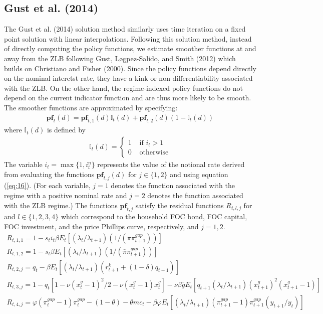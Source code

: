 \documentclass[12pt, final]{article}
\begin{document}
\subsection{Gust et al. (2014)}
The Gust et al. (2014) solution method similarly uses time iteration on a fixed point solution with linear interpolations. Following this solution method, instead of directly computing the policy functions, we estimate smoother functions at and away from the ZLB following Gust, L{\o g}pez-Salido, and Smith (2012) which builds on Christiano and Fisher (2000). Since the policy functions depend directly on the nominal interetst rate, they have a kink or non-differentiability associated with the ZLB.  On the other hand, the regime-indexed policy functions do not depend on the current indicator function and are thus more likely to be smooth. The smoother functions are approximated by specifying:
\begin{gather}
  \textbf{pf}_t(d) = \textbf{pf}_{t,1}(d)\mathds{I}_t(d) + \textbf{pf}_{t,2}(d)(1-\mathds{I}_t(d))
\end{gather}
where $\mathds{I}_t(d)$ is defined by
\begin{gather}
  \mathds{I}_t(d) = 
\begin{cases}
     1 &\text{ if } i_t > 1\\
     0 &\text{ otherwise}
\end{cases}
\end{gather}
The variable $i_t=\max\{1,i_t^n\}$ represents the value of the notional rate derived from evaluating the functions $\textbf{pf}_{t,j}(d)$ for $j \in \{1,2\}$ and using equation (\ref{eq:16}). (For each variable, $j=1$ denotes the function associated with the regime with a positive nominal rate and $j=2$ denotes the function associated with the ZLB regime.) %
The functions $\textbf{pf}_{t,j}$ satisfy the residual functions $R_{t,l,j}$ for and $l \in \{1,2,3,4\}$ which correspond to the household FOC bond, FOC capital, FOC investment, and the price Phillips curve, respectively, and $j = 1,2$.
\begin{gather}
  R_{t,1,1} = 1 - s_ti_t\beta E_t[(\lambda_t/\lambda_{t+1})(1/(\bar{\pi}\pi_{t+1}^{gap}))]\\
  R_{t,1,2} = 1 - s_t\beta E_t[(\lambda_t/\lambda_{t+1})(1/(\bar{\pi}\pi_{t+1}^{gap}))]\\
  R_{t,2,j} = q_t - \beta E_t[(\lambda_t/\lambda_{t+1})(r^k_{t+1}+(1-\delta)q_{t+1})]\\
  R_{t,3,j} = 1 - q_t[1-\nu(x^g_t-1)^2/2 - \nu(x_t^g-1)x_t^g] - \nu\beta\bar{g}E_t[q_{t+1}(\lambda_t/\lambda_{t+1})(x^g_{t+1})^2(x^g_{t+1}-1)]\\
  R_{t,4,j} = \varphi(\pi_t^{gap}-1)\pi_t^{gap} - (1-\theta) - \theta mc_t - \beta\varphi E_t[(\lambda_t/\lambda_{t+1})(\pi_{t+1}^{gap}-1)\pi_{t+1}^{gap}(y_{t+1}/y_t)]
  \end{gather}
\end{document}
